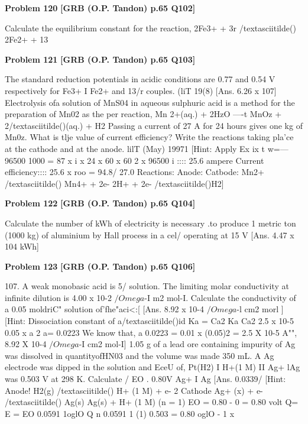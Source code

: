 \begin{problembox}
\textbf{Problem 120} \hfill \textbf{[GRB (O.P. Tandon) p.65 Q102]}
\label{q:ext-grb_all_questions-120}

Calculate the equilibrium constant for the reaction, 
2Fe3+ + 3r /textasciitilde() 
2Fe2+ + 13
\end{problembox}

\begin{problembox}
\textbf{Problem 121} \hfill \textbf{[GRB (O.P. Tandon) p.65 Q103]}
\label{q:ext-grb_all_questions-121}

The standard reduction potentials in acidic conditions are 0.77 
and 0.54 V respectively for Fe3+ I Fe2+ and 13/r couples. 
(liT 19(8) 
[Ans. 
6.26 x 107] 
Electrolysis ofa solution of MnS04 in aqueous sulphuric acid 
is a method for the preparation of Mn02 as the per reaction, 
Mn 2+(aq.) + 2HzO ----t MnOz + 2/textasciitilde()(aq.) + H2 
Passing a current of 27 A for 24 hours gives one kg of Mn0z. 
What is tlje value of current efficiency? Write the reactions 
taking pla'ce at the cathode and at the anode. lilT (May) 19971 
[Hint: 
Apply 
Ex ix t 
w=---
96500 
1000 = 87 x i x 24 x 60 x 60 
2 x 96500 
i :::: 25.6 ampere 
Current efficiency:::: 25.6 x roo = 94.8/%
27.0 
Reactions: 
Anode: 
Catbode: 
Mn2+ /textasciitilde() 
Mn4+ + 2e-
2H+ + 2e- /textasciitilde()H2]
\end{problembox}

\begin{problembox}
\textbf{Problem 122} \hfill \textbf{[GRB (O.P. Tandon) p.65 Q104]}
\label{q:ext-grb_all_questions-122}

Calculate the number of kWh of electricity is necessary .to 
produce 1 metric ton (1000 kg) of aluminium by Hall process 
in a cel/ operating at 15 V 
[Ans. 
4.47 x 104 kWh]
\end{problembox}

\begin{problembox}
\textbf{Problem 123} \hfill \textbf{[GRB (O.P. Tandon) p.65 Q106]}
\label{q:ext-grb_all_questions-123}

107. 
A weak monobasic acid is 5/%
solution. The limiting molar conductivity at infinite dilution is 
4.00 x 10-2 $/Omega$-I m2 mol-I. Calculate the conductivity of a 
0.05 moldriC" solution of'fhe"aci<:[ 
[Ans. 
8.92 x 10-4 $/Omega$-l cm2 morl ] 
[Hint: 
Dissociation constant of a/textasciitilde()id Ka = Ca2 
Ka 
Ca2 
2.5 x 10-5 
0.05 x a 2 
a= 0.0223 
We know that, a 
0.0223 
= 0.01 x (0.05)2 
= 2.5 X 10-5 
A"", 
8.92 X 10-4 $/Omega$-I cm2 mol-I] 
1.05 g of a lead ore containing impurity of Ag was dissolved in 
quantityofHN03 and the volume was made 350 mL. A Ag 
electrode was dipped in the solution and EceU of, 
Pt(H2) I H+(1 M) II Ag+ lAg 
was 0.503 V at 298 K. Calculate /%
EO 
. 
0.80V 
Ag+ I Ag 
[Ans. 
0.0339/%
[Hint: 
Anode! H2(g) /textasciitilde() 
H+ (1 M) + e-
2 
Cathode Ag+ (x) + e- /textasciitilde() 
Ag(s) 
Ag(s) + H+ (1 M) 
(n = 1) 
EO = 0.80 - 0 = 0.80 volt 
Q= 
E = EO 
0.0591 1oglO Q 
n 
0.0591 1 
(1) 
0.503 = 0.80 
oglO -
1 
x
\end{problembox}

